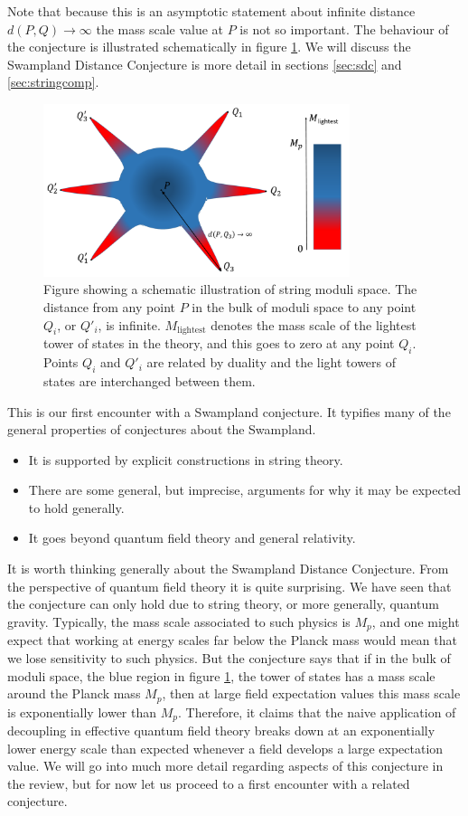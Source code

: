 \documentclass[11pt,a4paper]{article}
\numberwithin{equation}{section}
\numberwithin{table}{section}\setlength{\multlinegap}{25pt}
\begin{document}
Note that because this is an asymptotic statement about infinite distance $d\left(P,Q\right)\rightarrow \infty$ the mass scale value at $P$ is not so important. The behaviour of the conjecture is illustrated schematically in figure \ref{fig:sdcg}. We will discuss the Swampland Distance Conjecture is more detail in sections \ref{sec:sdc} and \ref{sec:stringcomp}. 
\begin{figure}[t]
\centering
 \includegraphics[width=0.8\textwidth]{figsdcg.pdf}
\caption{Figure showing a schematic illustration of string moduli space. The distance from any point $P$ in the bulk of moduli space to any point $Q_i$, or $Q'_i$, is infinite. $M_{\mathrm{lightest}}$ denotes the mass scale of the lightest tower of states in the theory, and this goes to zero at any point $Q_i$. Points $Q_i$ and $Q'_i$ are related by duality and the light towers of states are interchanged between them. }
\label{fig:sdcg}
\end{figure}

This is our first encounter with a Swampland conjecture. It typifies many of the general properties of conjectures about the Swampland. 
\begin{itemize}
\item It is supported by explicit constructions in string theory.
\item There are some general, but imprecise, arguments for why it may be expected to hold generally.
\item It goes beyond quantum field theory and general relativity.
\end{itemize}

It is worth thinking generally about the Swampland Distance Conjecture. From the perspective of quantum field theory it is quite surprising. We have seen that the conjecture can only hold due to string theory, or more generally, quantum gravity. Typically, the mass scale associated to such physics is $M_p$, and one might expect that working at energy scales far below the Planck mass would mean that we lose sensitivity to such physics. But the conjecture says that if in the bulk of moduli space, the blue region in figure \ref{fig:sdcg}, the tower of states has a mass scale around the Planck mass $M_p$, then at large field expectation values this mass scale is exponentially lower than $M_p$. Therefore, it claims that the naive application of decoupling in effective quantum field theory breaks down at an exponentially lower energy scale than expected whenever a field develops a large expectation value. We will go into much more detail regarding aspects of this conjecture in the review, but for now let us proceed to a first encounter with a related conjecture. 
\end{document}

